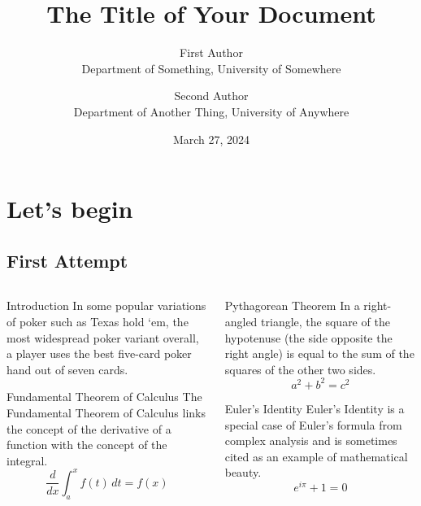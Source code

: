 \documentclass[final]{beamer}
\title{The Title of Your Document}
\author{
    First Author \\
    Department of Something, University of Somewhere \and
    Second Author \\
    Department of Another Thing, University of Anywhere
}
\date{March 27, 2024} %
\begin{document}
\maketitle

\chapter{Let's begin}
    \section{First Attempt}


\begin{frame}[t]
\begin{columns}[t]

\begin{column}{.48\linewidth}


\begin{block}{Introduction}
    In some popular variations of poker such as Texas hold `em, 
    the most widespread poker variant overall, a player uses the best five-card poker hand out of seven cards.
\end{block}

\begin{block}{Fundamental Theorem of Calculus}
The Fundamental Theorem of Calculus links the concept of the derivative of a function with the concept of the integral.
\[
\frac{d}{dx} \int_a^x f(t)\, dt = f(x)
\]
\end{block}
\end{column}

\begin{column}{.48\linewidth}
\begin{block}{Pythagorean Theorem}
In a right-angled triangle, the square of the hypotenuse (the side opposite the right angle) is equal to the sum of the squares of the other two sides.
\[
a^2 + b^2 = c^2
\]
\end{block}

\begin{block}{Euler's Identity}
Euler's Identity is a special case of Euler's formula from complex analysis and is sometimes cited as an example of mathematical beauty.
\[
e^{i\pi} + 1 = 0
\]
\end{block}
\end{column}


\end{columns}
\end{frame}
\end{document}
